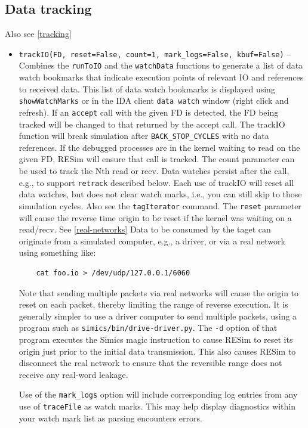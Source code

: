 \documentclass[titlepage]{article}
\begin{document}
\subsection{Data tracking}
Also see \ref{tracking}
\begin{itemize}

\item {\tt trackIO(FD, reset=False, count=1, mark\_logs=False, kbuf=False)} -- Combines the {\tt runToIO} and the {\tt watchData} functions to generate a list of data watch bookmarks that indicate execution
points of relevant IO and references to received data.  This list of data watch bookmarks is displayed using {\tt showWatchMarks} or in the IDA client {\tt data watch} window (right click and refresh).
If an {\tt accept} call with the given FD is detected, the FD being tracked will be changed to that returned by the accept call.
The trackIO function will break simulation after {\tt BACK\_STOP\_CYCLES} with no data references. If the debugged processes are in the kernel waiting to read on the given
FD, RESim will ensure that call is tracked.  The count parameter can be used to track the Nth read or recv.   Data watches persist after the
call, e.g., to support {\tt retrack} described below.  Each use of trackIO will reset all data watches, but does not clear watch marks, i.e., you can still skip to those simulation cycles.  Also see 
the {\tt tagIterator} command.  The {\tt reset} parameter will cause the reverse time origin to be reset if the kernel was waiting on a read/recv. See \ref{real-networks}  Data to be consumed by the taget can originate from a simulated computer, e.g., a driver, or via a real network using something like:
\begin{verbatim}
    cat foo.io > /dev/udp/127.0.0.1/6060 
\end{verbatim}
\noindent Note that sending multiple packets via real networks will cause the origin to reset on each packet, thereby limiting the range of reverse execution.  It is generally simpler
to use a driver computer to send multiple packets, using a program such as {\tt simics/bin/drive-driver.py}.  The {\tt -d} option of that program executes the Simics magic instruction to cause RESim to reset
its origin just prior to the initial data transmission.  This also causes RESim to disconnect the real network to ensure that the reversible range does not receive any real-word leakage.

Use of the {\tt mark\_logs} option will include corresponding log entries from any use of {\tt traceFile} as watch marks.  This may help display diagnostics
within your watch mark list as parsing encounters errors.


\end{itemize}
\end{document}

